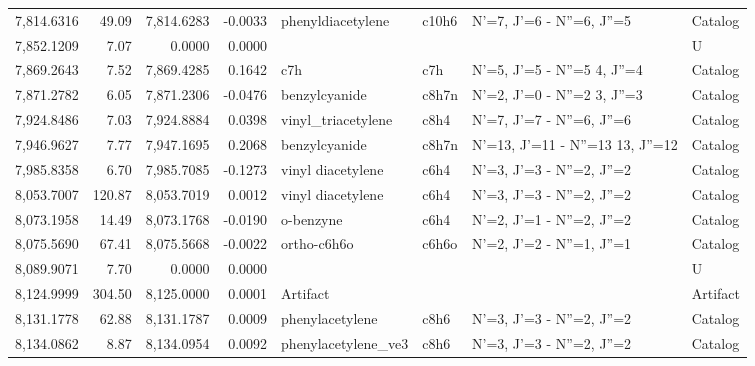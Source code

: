 \begin{longtable}{rrrrllll}
 7,814.6316 &     49.09 &        7,814.6283 &   -0.0033 &           phenyldiacetylene &   c10h6 &            N'=7, J'=6 - N''=6, J''=5 &    Catalog \\
 7,852.1209 &      7.07 &            0.0000 &    0.0000 &                             &         &                                      &          U \\
 7,869.2643 &      7.52 &        7,869.4285 &    0.1642 &                         c7h &     c7h &      N'=5, J'=5 - N''=5     4, J''=4 &    Catalog \\
 7,871.2782 &      6.05 &        7,871.2306 &   -0.0476 &               benzylcyanide &   c8h7n &      N'=2, J'=0 - N''=2     3, J''=3 &    Catalog \\
 7,924.8486 &      7.03 &        7,924.8884 &    0.0398 &          vinyl_triacetylene &    c8h4 &            N'=7, J'=7 - N''=6, J''=6 &    Catalog \\
 7,946.9627 &      7.77 &        7,947.1695 &    0.2068 &               benzylcyanide &   c8h7n &  N'=13, J'=11 - N''=13    13, J''=12 &    Catalog \\
 7,985.8358 &      6.70 &        7,985.7085 &   -0.1273 &           vinyl diacetylene &    c6h4 &            N'=3, J'=3 - N''=2, J''=2 &    Catalog \\
 8,053.7007 &    120.87 &        8,053.7019 &    0.0012 &           vinyl diacetylene &    c6h4 &            N'=3, J'=3 - N''=2, J''=2 &    Catalog \\
 8,073.1958 &     14.49 &        8,073.1768 &   -0.0190 &                   o-benzyne &    c6h4 &            N'=2, J'=1 - N''=2, J''=2 &    Catalog \\
 8,075.5690 &     67.41 &        8,075.5668 &   -0.0022 &                 ortho-c6h6o &   c6h6o &            N'=2, J'=2 - N''=1, J''=1 &    Catalog \\
 8,089.9071 &      7.70 &            0.0000 &    0.0000 &                             &         &                                      &          U \\
 8,124.9999 &    304.50 &        8,125.0000 &    0.0001 &                    Artifact &         &                                      &   Artifact \\
 8,131.1778 &     62.88 &        8,131.1787 &    0.0009 &             phenylacetylene &    c8h6 &            N'=3, J'=3 - N''=2, J''=2 &    Catalog \\
 8,134.0862 &      8.87 &        8,134.0954 &    0.0092 &         phenylacetylene_ve3 &    c8h6 &            N'=3, J'=3 - N''=2, J''=2 &    Catalog \\

\end{longtable}
